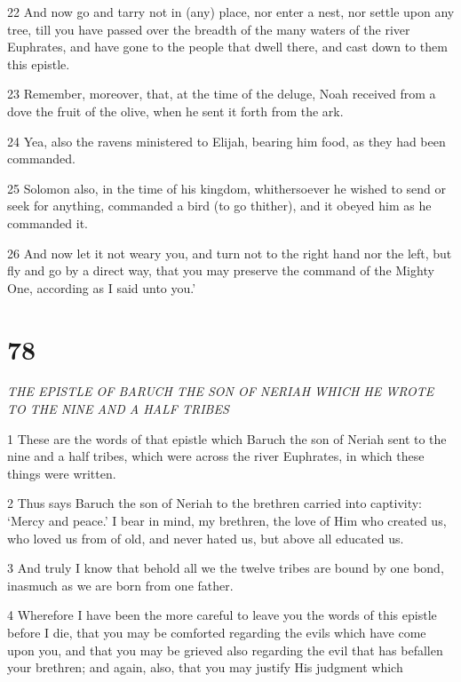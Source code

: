 \par 22 And now go and tarry not in (any) place, nor enter a nest, nor settle upon any tree, till you have passed over the breadth of the many waters of the river Euphrates, and have gone to the people that dwell there, and cast down to them this epistle. 

\par 23 Remember, moreover, that, at the time of the deluge, Noah received from a dove the fruit of the olive, when he sent it forth from the ark. 

\par 24 Yea, also the ravens ministered to Elijah, bearing him food, as they had been commanded. 

\par 25 Solo­mon also, in the time of his kingdom, whithersoever he wished to send or seek for anything, commanded a bird (to go thither), and it obeyed him as he commanded it. 

\par 26 And now let it not weary you, and turn not to the right hand nor the left, but fly and go by a direct way, that you may preserve the command of the Mighty One, according as I said unto you.’

\chapter{78}

\par \textit{THE EPISTLE OF BARUCH THE SON OF NERIAH WHICH HE WROTE TO THE NINE AND A HALF TRIBES}

\par 1 These are the words of that epistle which Baruch the son of Neriah sent to the nine and a half tribes, which were across the river Euphrates, in which these things were written.

\par 2 Thus says Baruch the son of Neriah to the brethren carried into captivity: ‘Mercy and peace.’ I bear in mind, my brethren, the love of Him who created us, who loved us from of old, and never hated us, but above all educated us. 

\par 3 And truly I know that behold all we the twelve tribes are bound by one bond, inasmuch as we are born from one father. 

\par 4 Wherefore I have been the more careful to leave you the words of this epistle before I die, that you may be comforted regarding the evils which have come upon you, and that you may be grieved also regarding the evil that has befallen your brethren; and again, also, that you may justify His judgment which 

